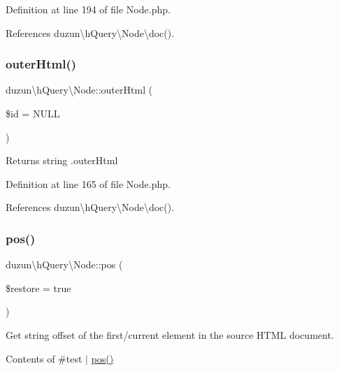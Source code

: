 Definition at line 194 of file Node.\+php.



References duzun\textbackslash{}h\+Query\textbackslash{}\+Node\textbackslash{}doc().

\mbox{\label{classduzun_1_1hQuery_1_1Node_ab3fb9d5a73f184da3a2a70d7ef73827c}} 
\subsubsection{\texorpdfstring{outer\+Html()}{outerHtml()}}
{\footnotesize\ttfamily duzun\textbackslash{}h\+Query\textbackslash{}\+Node\+::outer\+Html (\begin{DoxyParamCaption}\item[{}]{\$id = {\ttfamily NULL} }\end{DoxyParamCaption})}

\begin{DoxyReturn}{Returns}
string .outer\+Html 
\end{DoxyReturn}


Definition at line 165 of file Node.\+php.



References duzun\textbackslash{}h\+Query\textbackslash{}\+Node\textbackslash{}doc().

\mbox{\label{classduzun_1_1hQuery_1_1Node_a781a7e7f2540c4787915407279683e6f}} 
\subsubsection{\texorpdfstring{pos()}{pos()}}
{\footnotesize\ttfamily duzun\textbackslash{}h\+Query\textbackslash{}\+Node\+::pos (\begin{DoxyParamCaption}\item[{}]{\$restore = {\ttfamily true} }\end{DoxyParamCaption})}

Get string offset of the first/current element in the source H\+T\+ML document.

 Contents of \#test  $\vert$ \mbox{\hyperlink{classduzun_1_1hQuery_1_1Node_a781a7e7f2540c4787915407279683e6f}{pos()}}


